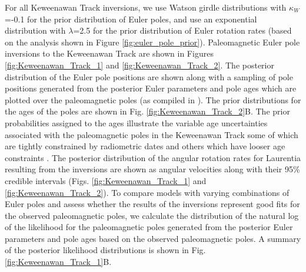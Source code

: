 \documentclass[11pt,letterpaper]{article}
\begin{document}
For all Keweenawan Track inversions, we use Watson girdle distributions with $\kappa_W$=-0.1 for the prior distribution of Euler poles, and use an exponential distribution with $\lambda$=2.5 for the prior distribution of Euler rotation rates (based on the analysis shown in Figure \ref{fig:euler_pole_prior}). Paleomagnetic Euler pole inversions to the Keweenawan Track are shown in Figures \ref{fig:Keweenawan_Track_1} and \ref{fig:Keweenawan_Track_2}. The posterior distribution of the Euler pole positions are shown along with a sampling of pole positions generated from the posterior Euler parameters and pole ages which are plotted over the paleomagnetic poles (as compiled in \cite{Swanson-Hysell2019a}). The prior distributions for the ages of the poles are shown in Fig. \ref{fig:Keweenawan_Track_2}B. The prior probabilities assigned to the ages illustrate the variable age uncertainties associated with the paleomagnetic poles in the Keweenawan Track some of which are tightly constrained by radiometric dates and others which have looser age constraints \citep{Swanson-Hysell2019a}. The posterior distribution of the angular rotation rates for Laurentia resulting from the inversions are shown as angular velocities along with their 95\% credible intervals (Figs. \ref{fig:Keweenawan_Track_1} and \ref{fig:Keweenawan_Track_2}). To compare models with varying combinations of Euler poles and assess whether the results of the inversions represent good fits for the observed paleomagnetic poles, we calculate the distribution of the natural log of the likelihood for the paleomagnetic poles generated from the posterior Euler parameters and pole ages based on the observed paleomagnetic poles. A summary of the posterior likelihood distributions is shown in Fig. \ref{fig:Keweenawan_Track_1}B. 
\end{document}
